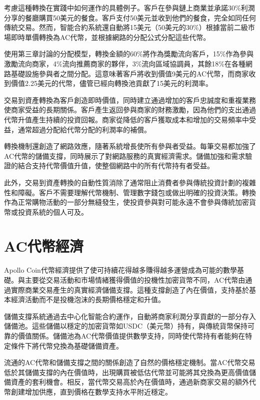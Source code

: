 \documentclass[
  Letterpaper,
]{scrbook}
\begin{document}
考慮這種轉換在實踐中如何運作的具體例子。客戶在參與鏈上商業並承諾30\%利潤分享的餐廳購買50美元的餐食。客戶支付50美元並收到他們的餐食，完全如同任何傳統交易。然而，智能合約系統還自動將15美元（50美元的30\%）根據當前二級市場即時單價轉換為AC代幣，並根據網路的分配公式分配這些代幣。

使用第三章討論的分配模型，轉換金額的60\%將作為獎勵流向客戶，15\%作為參與激勵流向商家，4\%流向推薦商家的夥伴，3\%流向區域協調員，其餘18\%在各種網路基礎設施參與者之間分配。這意味著客戶將收到價值9美元的AC代幣，而商家收到價值2.25美元的代幣，儘管已經向轉換池貢獻了15美元的利潤率。

交易到資產轉換為客戶創造即時價值，同時建立通過增加的客戶忠誠度和重複業務使商家受益的長期關係。客戶產生返回參與商家的財務激勵，因為他們的支出通過代幣升值產生持續的投資回報。商家從降低的客戶獲取成本和增加的交易頻率中受益，通常超過分配給代幣分配的利潤率的補償。

轉換機制還創造了網路效應，隨著系統增長使所有參與者受益。每筆交易都加強了AC代幣的儲備支撐，同時展示了對網路服務的真實經濟需求。儲備加強和需求驗證的結合支持代幣價值升值，使整個網路中的所有代幣持有者受益。

此外，交易到資產轉換的自動性質消除了通常阻止消費者參與傳統投資計劃的複雜性和障礙。客戶不需要理解代幣機制、管理數字錢包或做出明確的投資決策。轉換作為正常購物活動的一部分無縫發生，使投資參與對可能永遠不會參與傳統加密貨幣或投資系統的個人可及。

\section{AC代幣經濟}\label{acux4ee3ux5e63ux7d93ux6fdf}

Apollo
Coin代幣經濟提供了使可持續花得越多賺得越多運營成為可能的數學基礎。與主要從交易活動和市場情緒獲得價值的投機性加密貨幣不同，AC代幣由通過實際商業交易產生的真實經濟儲備支撐。這種支撐創造了內在價值，支持基於基本經濟活動而不是投機泡沫的長期價格穩定和升值。

儲備支撐系統通過去中心化智能合約運作，自動將商家利潤分享貢獻的一部分存入儲備池。這些儲備以穩定的加密貨幣如USDC（美元幣）持有，與傳統貨幣保持可靠的價值關係。儲備池為AC代幣價值提供數學支持，同時使代幣持有者能夠在特定條件下將代幣兌換為基礎儲備資產。

流通的AC代幣和儲備支撐之間的關係創造了自然的價格穩定機制。當AC代幣交易低於其儲備支撐的內在價值時，出現購買被低估代幣並可能將其兌換為更高價值儲備資產的套利機會。相反，當代幣交易高於內在價值時，通過新商家交易的額外代幣創建增加供應，直到價格在數學支持水平附近穩定。
\end{document}
